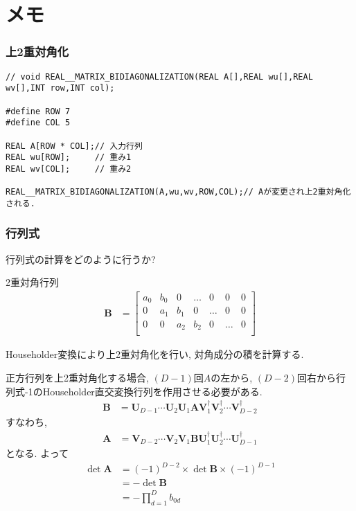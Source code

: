\documentclass[a4j]{jsarticle}
\begin{document}
\section{メモ}

\subsubsection{上2重対角化}
\begin{lstlisting}[caption=上2重対角化,label=ほげ]
// void REAL__MATRIX_BIDIAGONALIZATION(REAL A[],REAL wu[],REAL wv[],INT row,INT col);

#define ROW 7
#define COL 5

REAL A[ROW * COL];// 入力行列
REAL wu[ROW];     // 重み1
REAL wv[COL];     // 重み2

REAL__MATRIX_BIDIAGONALIZATION(A,wu,wv,ROW,COL);// Aが変更され上2重対角化される. 

\end{lstlisting}

\subsubsection{行列式}
行列式の計算をどのように行うか?

2重対角行列
\begin{align}
\bm{B}&=
\begin{bmatrix}
a_{0}&b_{0}&0&\ldots &0&0&0\\
0&a_{1}&b_{1}&0&\ldots &0&0\\
0&0&a_{2}&b_{2}&0&\ldots &0\\
\end{bmatrix}
\end{align}

Householder変換により上2重対角化を行い, 対角成分の積を計算する. 

正方行列を上2重対角化する場合, 
$(D-1)$回$A$の左から, $(D-2)$回右から行列式-1のHouseholder直交変換行列を作用させる必要がある. 
\begin{align}
\bm{B}&=\bm{U}_{D-1}\cdots \bm{U}_{2}\bm{U}_{1}\bm{A}\bm{V}_{1}^{\dag}\bm{V}_{2}^{\dag}\cdots \bm{V}_{D-2}^{\dag}
\end{align}
すなわち, 
\begin{align}
\bm{A}&=\bm{V}_{D-2}\cdots \bm{V}_{2}\bm{V}_{1}\bm{B}\bm{U}_{1}^{\dag}\bm{U}_{2}^{\dag}\cdots \bm{U}_{D-1}^{\dag}
\end{align}
となる. よって
\begin{align}
\det \bm{A}&=(-1)^{D-2}\times \det \bm{B}\times (-1)^{D-1}\nonumber\\
&=-\det \bm{B}\nonumber\\
&=-\prod _{d=1}^{D}b_{0d}
\end{align}
\end{document}
